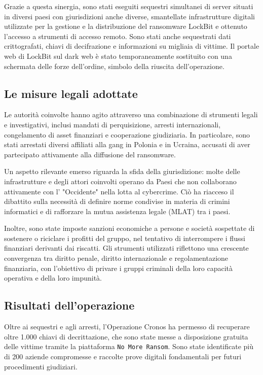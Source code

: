 \documentclass[a4paper,12pt]{article}
\begin{document}
Grazie a questa sinergia, sono stati eseguiti sequestri simultanei di server situati in diversi paesi con giurisdizioni anche diverse, smantellate infrastrutture digitali utilizzate per la gestione e la distribuzione del ransomware LockBit e ottenuto l'accesso a strumenti di accesso remoto. Sono stati anche sequestrati dati crittografati, chiavi di decifrazione e informazioni su migliaia di vittime. Il portale web di LockBit sul dark web è stato temporaneamente sostituito con una schermata delle forze dell’ordine, simbolo della riuscita dell’operazione.

\subsection{Le misure legali adottate}
Le autorità coinvolte hanno agito attraverso una combinazione di strumenti legali e investigativi, inclusi mandati di perquisizione, arresti internazionali, congelamento di asset finanziari e cooperazione giudiziaria. In particolare, sono stati arrestati diversi affiliati alla gang in Polonia e in Ucraina, accusati di aver partecipato attivamente alla diffusione del ransomware.

Un aspetto rilevante emerso riguarda la sfida della giurisdizione: molte delle infrastrutture e degli attori coinvolti operano da Paesi che non collaborano attivamente con l’ "Occidente" nella lotta al cybercrime. Ciò ha riacceso il dibattito sulla necessità di definire norme condivise in materia di crimini informatici e di rafforzare la mutua assistenza legale (MLAT) tra i paesi.

Inoltre, sono state imposte sanzioni economiche a persone e società sospettate di sostenere o riciclare i profitti del gruppo, nel tentativo di interrompere i flussi finanziari derivanti dai riscatti. Gli strumenti utilizzati riflettono una crescente convergenza tra diritto penale, diritto internazionale e regolamentazione finanziaria, con l’obiettivo di privare i gruppi criminali della loro capacità operativa e della loro impunità.

\subsection{Risultati dell'operazione}
Oltre ai sequestri e agli arresti, l’Operazione Cronos ha permesso di recuperare oltre 1.000 chiavi di decrittazione, che sono state messe a disposizione gratuita delle vittime tramite la piattaforma \texttt{No More Ransom}. Sono state identificate più di 200 aziende compromesse e raccolte prove digitali fondamentali per futuri procedimenti giudiziari.
\end{document}
